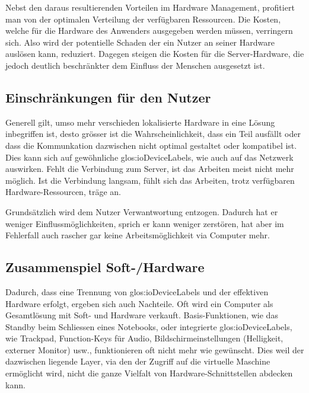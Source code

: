Nebst den daraus resultierenden Vorteilen im Hardware Management, profitiert man von der optimalen Verteilung der verfügbaren Ressourcen.
Die Kosten, welche für die Hardware des Anwenders ausgegeben werden müssen, verringern sich.
Also wird der potentielle Schaden der ein Nutzer an seiner Hardware auslösen kann, reduziert.
Dagegen steigen die Kosten für die Server-Hardware, die jedoch deutlich beschränkter dem Einfluss der Menschen ausgesetzt ist.

\subsection{Einschränkungen für den Nutzer}
Generell gilt, umso mehr verschieden lokalisierte Hardware in eine Lösung inbegriffen ist, desto grösser ist die Wahrscheinlichkeit, dass ein Teil ausfällt oder dass die Kommunkation dazwischen nicht optimal gestaltet oder kompatibel ist.
Dies kann sich auf gewöhnliche \glspl{glos:ioDeviceLabel}, wie auch auf das Netzwerk auswirken.
Fehlt die Verbindung zum Server, ist das Arbeiten meist nicht mehr möglich.
Ist die Verbindung langsam, fühlt sich das Arbeiten, trotz verfügbaren Hardware-Ressourcen, träge an.

Grundsätzlich wird dem Nutzer Verwantwortung entzogen. Dadurch hat er weniger Einflussmöglichkeiten, sprich er kann weniger zerstören, hat aber im Fehlerfall auch rascher gar keine Arbeitsmöglichkeit via Computer mehr.

\subsection{Zusammenspiel Soft-/Hardware}
Dadurch, dass eine Trennung von \glspl{glos:ioDeviceLabel} und der effektiven Hardware erfolgt, ergeben sich auch Nachteile.
Oft wird ein Computer als Gesamtlösung mit Soft- und Hardware verkauft.
Basis-Funktionen, wie das Standby beim Schliessen eines Notebooks, oder integrierte \glspl{glos:ioDeviceLabel}, wie Trackpad, Function-Keys für Audio, Bildschirmeinstellungen (Helligkeit, externer Monitor) usw., funktionieren oft nicht mehr wie gewünscht.
Dies weil der dazwischen liegende Layer, via den der Zugriff auf die virtuelle Maschine ermöglicht wird,  nicht die ganze Vielfalt von Hardware-Schnittstellen abdecken kann.


